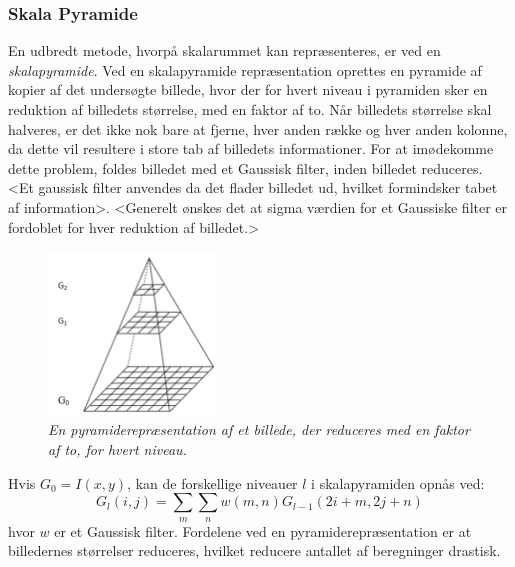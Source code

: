 \subsubsection*{Skala Pyramide}
En udbredt metode, hvorpå skalarummet kan repræsenteres, er ved en \textit{skalapyramide}. Ved en skalapyramide repræsentation oprettes en pyramide af kopier af det undersøgte billede, hvor der for hvert niveau i pyramiden sker en reduktion af billedets størrelse, med en faktor af to. 
Når billedets størrelse skal halveres, er det ikke nok bare at fjerne, hver anden række og hver anden kolonne, da dette vil resultere i store tab af billedets informationer. For at imødekomme dette problem, foldes billedet med et Gaussisk filter, inden billedet reduceres. <Et gaussisk filter anvendes da det flader billedet ud, hvilket formindsker tabet af information>. <Generelt ønskes det at sigma værdien for et Gaussiske filter er fordoblet for hver reduktion af billedet.>
 \begin{figure}[H]
    \centering
    \includegraphics[width=0.40\textwidth]{fig/40.png}
     \vspace{-1em}
    \begin{center}    
       \caption{{\footnotesize \textit{En pyramiderepræsentation af et billede, der reduceres med en faktor af to, for hvert niveau. }}}
    \label{fig:scalerepdiff}
     \end{center}
     \vspace{-2.5em}
  \end{figure} \noindent
Hvis $G_0=I(x,y)$, kan de forskellige niveauer $l$ i skalapyramiden opnås ved:
\begin{equation}
G_l(i,j)=\sum\limits_{m}\sum\limits_{n}w(m,n)G_{l-1}(2i+m,2j+n)
\end{equation}
hvor $w$ er et Gaussisk filter. Fordelene ved en pyramiderepræsentation er at billedernes størrelser reduceres, hvilket reducere antallet af beregninger drastisk.